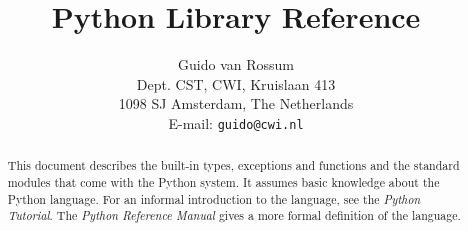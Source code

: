 \title{\bf
	Python Library Reference
}

\author{
	Guido van Rossum \\
	Dept. CST, CWI, Kruislaan 413 \\
	1098 SJ Amsterdam, The Netherlands \\
	E-mail: {\tt guido@cwi.nl}
}

\makeindex




\maketitle

\begin{abstract}

\noindent
This document describes the built-in types, exceptions and functions
and the standard modules that come with the Python system.  It assumes
basic knowledge about the Python language.  For an informal
introduction to the language, see the {\em Python Tutorial}.  The {\em
Python Reference Manual} gives a more formal definition of the
language.

\end{abstract}

\pagebreak

\tableofcontents

\pagebreak




